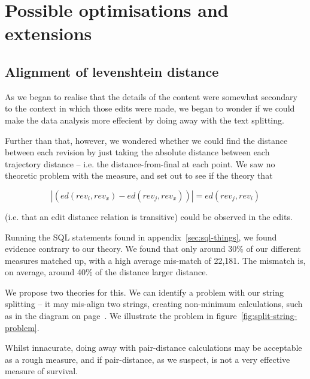 \section{Possible optimisations and extensions}
\subsection*{Alignment of levenshtein distance}
\label{split-distance-eval}
As we began to realise that the details of the content were somewhat
secondary to the context in which those edits were made, we began to
wonder if we could make the data analysis more effecient by doing away
with the text splitting.

Further than that, however, we wondered whether we could find the
distance between each revision by just taking the absolute distance
between each trajectory distance -- i.e. the distance-from-final at
each point. We saw no theoretic problem with the measure, and set out
to see if the theory that

\[
  |(ed(rev_i,rev_x) - ed(rev_j,rev_x))| = ed(rev_j,rev_i)
\]

(i.e. that an edit distance relation is transitive) could be observed
in the edits. 

Running the SQL statements found in appendix~\ref{sec:sql-things}, we
found evidence contrary to our theory. We found that only around 30\%
of our different measures matched up, with a high average mis-match of
22,181. The mismatch is, on average, around 40\% of the distance
larger distance. 

We propose two theories for this. We can identify a problem with our
string splitting -- it may mis-align two strings, creating non-minimum
calculations, such as in the diagram on page~\pageref{fig:sub-opt}. We
illustrate the problem in figure~\ref{fig:split-string-problem}.

Whilst innacurate, doing away with pair-distance calculations may be
acceptable as a rough measure, and if pair-distance, as we suspect, is
not a very effective measure of survival.

